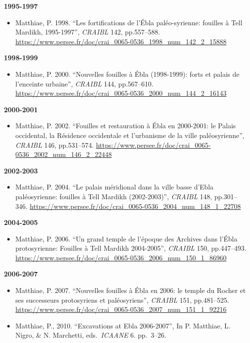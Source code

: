 \documentclass[
]{book}
\providecommand{\tightlist}{%
  \setlength{\itemsep}{0pt}\setlength{\parskip}{0pt}}
\begin{document}
\textbf{1995-1997}

\begin{itemize}
\tightlist
\item
  Matthiae, P. 1998. ``Les fortifications de l'Ébla paléo-syrienne: fouilles à Tell Mardikh, 1995-1997'', \emph{CRAIBL} 142, pp.557--588. \url{https://www.persee.fr/doc/crai_0065-0536_1998_num_142_2_15888}
\end{itemize}

\textbf{1998-1999}

\begin{itemize}
\tightlist
\item
  Matthiae, P. 2000. ``Nouvelles fouilles à Ébla (1998-1999): forts et palais de l'enceinte urbaine'', \emph{CRAIBL} 144, pp.567--610. \url{https://www.persee.fr/doc/crai_0065-0536_2000_num_144_2_16143}
\end{itemize}

\textbf{2000-2001}

\begin{itemize}
\tightlist
\item
  Matthiae, P. 2002. ``Fouilles et restauration à Ébla en 2000-2001: le Palais occidental, la Résidence occidentale et l'urbanisme de la ville paléosyrienne'', \emph{CRAIBL} 146, pp.531--574. \url{https://www.persee.fr/doc/crai_0065-0536_2002_num_146_2_22448}
\end{itemize}

\textbf{2002-2003}

\begin{itemize}
\tightlist
\item
  Matthiae, P. 2004. ``Le palais méridional dans la ville basse d'Ebla paléosyrienne: fouilles à Tell Mardikh (2002-2003)'', \emph{CRAIBL} 148, pp.301--346. \url{https://www.persee.fr/doc/crai_0065-0536_2004_num_148_1_22708}
\end{itemize}

\textbf{2004-2005}

\begin{itemize}
\tightlist
\item
  Matthiae, P. 2006. ``Un grand temple de l'époque des Archives dans l'Ébla protosyrienne: Fouilles à Tell Mardikh 2004-2005'', \emph{CRAIBL} 150, pp.447--493. \url{https://www.persee.fr/doc/crai_0065-0536_2006_num_150_1_86960}
\end{itemize}

\textbf{2006-2007}

\begin{itemize}
\tightlist
\item
  Matthiae, P. 2007. ``Nouvelles fouilles à Ébla en 2006: le temple du Rocher et ses successeurs protosyriens et paléosyriens'', \emph{CRAIBL} 151, pp.481--525. \url{https://www.persee.fr/doc/crai_0065-0536_2007_num_151_1_92216}
\item
  Matthiae, P., 2010. ``Excavations at Ebla 2006-2007'', In P. Matthiae, L. Nigro, \& N. Marchetti, eds.~\emph{ICAANE} 6. pp.~3--26.
\end{itemize}
\end{document}
